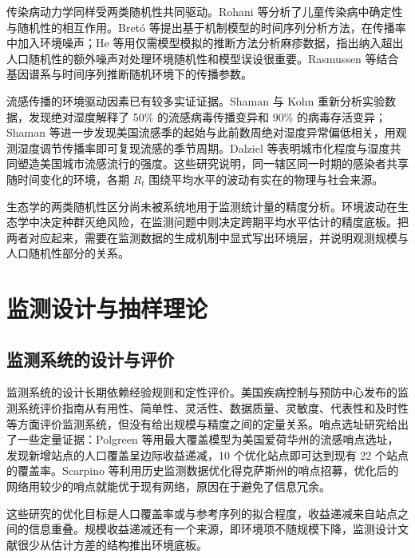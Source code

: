 传染病动力学同样受两类随机性共同驱动。Rohani 等分析了儿童传染病中确定性与随机性的相互作用\citep{rohani2002determinism}。Bret\'o 等提出基于机制模型的时间序列分析方法，在传播率中加入环境噪声\citep{breto2009time}；He 等用仅需模型模拟的推断方法分析麻疹数据，指出纳入超出人口随机性的额外噪声对处理环境随机性和模型误设很重要\citep{he2010plug}。Rasmussen 等结合基因谱系与时间序列推断随机环境下的传播参数\citep{rasmussen2011inference}。

流感传播的环境驱动因素已有较多实证证据。Shaman 与 Kohn 重新分析实验数据，发现绝对湿度解释了 50\% 的流感病毒传播变异和 90\% 的病毒存活变异\citep{shaman2009absolute}；Shaman 等进一步发现美国流感季的起始与此前数周绝对湿度异常偏低相关，用观测湿度调节传播率即可复现流感的季节周期\citep{shaman2010absolute}。Dalziel 等表明城市化程度与湿度共同塑造美国城市流感流行的强度\citep{dalziel2018urbanization}。这些研究说明，同一辖区同一时期的感染者共享随时间变化的环境，各期 $R_t$ 围绕平均水平的波动有实在的物理与社会来源。

生态学的两类随机性区分尚未被系统地用于监测统计量的精度分析。环境波动在生态学中决定种群灭绝风险，在监测问题中则决定跨期平均水平估计的精度底板。把两者对应起来，需要在监测数据的生成机制中显式写出环境层，并说明观测规模与人口随机性部分的关系。

\section{监测设计与抽样理论}
\label{sec:lit-design}

\subsection{监测系统的设计与评价}

监测系统的设计长期依赖经验规则和定性评价。美国疾病控制与预防中心发布的监测系统评价指南从有用性、简单性、灵活性、数据质量、灵敏度、代表性和及时性等方面评价监测系统\citep{german2001updated}，但没有给出规模与精度之间的定量关系。哨点选址研究给出了一些定量证据：Polgreen 等用最大覆盖模型为美国爱荷华州的流感哨点选址，发现新增站点的人口覆盖呈边际收益递减，10 个优化站点即可达到现有 22 个站点的覆盖率\citep{polgreen2009optimizing}。Scarpino 等利用历史监测数据优化得克萨斯州的哨点招募，优化后的网络用较少的哨点就能优于现有网络，原因在于避免了信息冗余\citep{scarpino2012optimizing}。

这些研究的优化目标是人口覆盖率或与参考序列的拟合程度，收益递减来自站点之间的信息重叠。规模收益递减还有一个来源，即环境项不随规模下降，监测设计文献很少从估计方差的结构推出环境底板。

